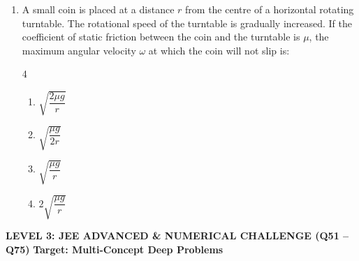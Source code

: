 \documentclass[11pt,a4paper]{article}
\begin{document}
\begin{enumerate}[label=\textbf{\arabic*.},leftmargin=18pt,itemsep=8pt,resume]
  \item A small coin is placed at a distance $r$ from the centre of a horizontal rotating turntable. The rotational speed of the turntable is gradually increased. If the coefficient of static friction between the coin and the turntable is $\mu$, the maximum angular velocity $\omega$ at which the coin will not slip is:
  \begin{multicols}{4}
    \begin{enumerate}[label=(\Alph*)]
      \item $\sqrt{\dfrac{2\mu g}{r}}$
      \item $\sqrt{\dfrac{\mu g}{2r}}$
      \item $\sqrt{\dfrac{\mu g}{r}}$
      \item $2\sqrt{\dfrac{\mu g}{r}}$
    \end{enumerate}
  \end{multicols}

\end{enumerate}
\newpage


\begin{tcolorbox}[l3banner]
  {\large \textbf{\textsf{LEVEL 3: JEE ADVANCED \& NUMERICAL CHALLENGE (Q51 -- Q75)}}} \hfill {\small \textbf{Target: Multi-Concept Deep Problems}}
\end{tcolorbox}
\vspace{4pt}

\noindent{\textbf{\textsf{\textcolor{l3Crimson}{Section A: Advanced Conceptual Multi-Choice Questions (Q51 -- Q69)}}}}
\vspace{2pt}
\end{document}
